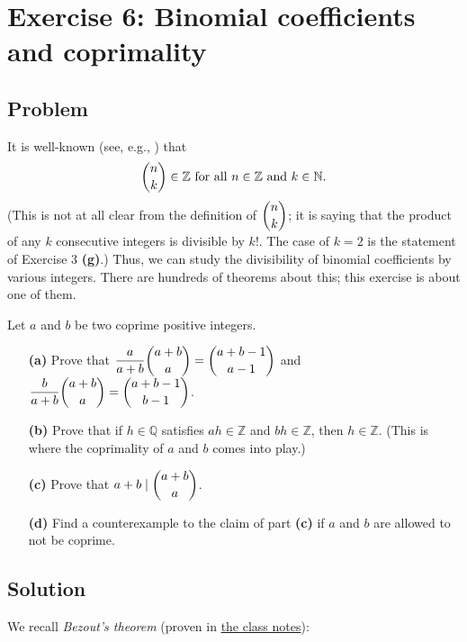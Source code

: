 \documentclass[paper=a4, fontsize=12pt]{scrartcl}%
\theoremstyle{plainsl}
\theoremstyle{definition}
\theoremstyle{remark}
\begin{document}
\section{Exercise 6: Binomial coefficients and coprimality}

\subsection{Problem}

It is well-known (see, e.g., \cite[Proposition 3.20]{detnotes}) that
\begin{equation}
\dbinom{n}{k}\in\mathbb{Z}\text{ for all }n\in\mathbb{Z}\text{ and }%
k\in\mathbb{N}. \label{eq.exe.binom.coprime-rat-cat-1.inZ}%
\end{equation}
(This is not at all clear from the definition of $\dbinom{n}{k}$; it is saying
that the product of any $k$ consecutive integers is divisible by $k!$. The
case of $k=2$ is the statement of Exercise 3 \textbf{(g)}.) Thus, we can study
the divisibility of binomial coefficients by various integers. There are
hundreds of theorems about this; this exercise is about one of them.

Let $a$ and $b$ be two coprime positive integers.

\begin{enumerate}
\item[\textbf{(a)}] Prove that $\dfrac{a}{a+b} \dbinom{a+b}{a} =
\dbinom{a+b-1}{a-1}$ and $\dfrac{b}{a+b} \dbinom{a+b}{a} = \dbinom{a+b-1}%
{b-1}$.

\item[\textbf{(b)}] Prove that if $h \in\mathbb{Q}$ satisfies $ah
\in\mathbb{Z}$ and $bh \in\mathbb{Z}$, then $h \in\mathbb{Z}$. (This is where
the coprimality of $a$ and $b$ comes into play.)

\item[\textbf{(c)}] Prove that $a+b \mid\dbinom{a+b}{a}$.

\item[\textbf{(d)}] Find a counterexample to the claim of part \textbf{(c)} if
$a$ and $b$ are allowed to not be coprime.
\end{enumerate}

\subsection{Solution}

We recall \textit{Bezout's theorem} (proven in
\href{http://www-users.math.umn.edu/~dgrinber/19s/notes.pdf}{the class notes}):
\end{document}
